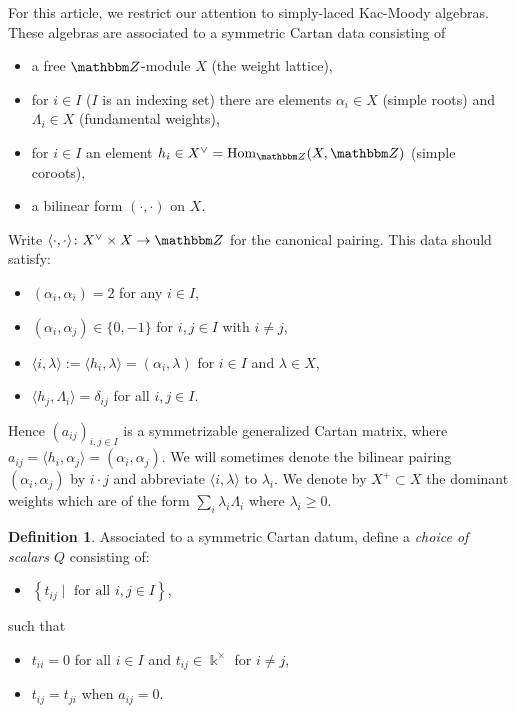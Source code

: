 \documentclass{amsart}
\numberwithin{equation}{section}
\theoremstyle{definition}
\newtheorem{definition}[thm]{Definition}
\def\Z{{\mathbbm Z}}
\def\la{\langle}
\def\ra{\rangle}
\newcommand{\Hom}{{\rm Hom}}
\renewcommand{\to}{\rightarrow}
\newcommand{\maps}{\colon}
\begin{document}
For this article, we restrict our attention to simply-laced Kac-Moody algebras. These algebras are associated to a symmetric Cartan data consisting of
\begin{itemize}
\item a free $\Z$-module $X$ (the weight lattice),
\item for $i \in I$ ($I$ is an indexing set) there are elements $\alpha_i \in X$ (simple roots) and $\Lambda_i \in X$ (fundamental weights),
\item for $i \in I$ an element $h_i \in X^\vee = \Hom_{\Z}(X,\Z)$ (simple coroots),
\item a bilinear form $(\cdot,\cdot )$ on $X$.
\end{itemize}
Write $\langle \cdot, \cdot \rangle \maps X^{\vee} \times X
\to \Z$ for the canonical pairing. This data should satisfy:
\begin{itemize}
\item $(\alpha_i, \alpha_i) = 2$ for any $i\in I$,
\item $(\alpha_i,\alpha_j) \in \{ 0, -1\}$  for $i,j\in I$ with $i \neq j$,
\item $\la i,\lambda\ra :=\langle h_i, \lambda \rangle =  (\alpha_i,\lambda)$
  for $i \in I$ and $\lambda \in X$,
\item $\langle h_j, \Lambda_i \rangle =\delta_{ij}$ for all $i,j \in I$.
\end{itemize}
Hence $(a_{ij})_{i,j\in I}$ is a symmetrizable generalized Cartan matrix, where $a_{ij}=\langle
h_i, \alpha_j \rangle=(\alpha_i, \alpha_j)$.  We will sometimes denote the bilinear pairing $(\alpha_i,\alpha_j)$ by $i \cdot j$ and abbreviate $\la i,\lambda\ra$ to $\lambda_i$.
We denote by $X^+ \subset X$ the dominant weights which are of the form $\sum_i \lambda_i \Lambda_i$ where $\lambda_i \ge 0$.

\begin{definition}
Associated to a symmetric Cartan datum, define a {\em choice of scalars $Q$} consisting of:
\begin{itemize}
  \item $\left\{ t_{ij}  \mid \text{ for all $i,j \in I$} \right\}$,
\end{itemize}
such that
\begin{itemize}
\item $t_{ii}=0$ for all $i \in I$ and $t_{ij} \in \Bbbk^{\times}$ for $i\neq j$,
 \item $t_{ij}=t_{ji}$ when $a_{ij}=0$.
\end{itemize}
\end{definition}
\end{document}
